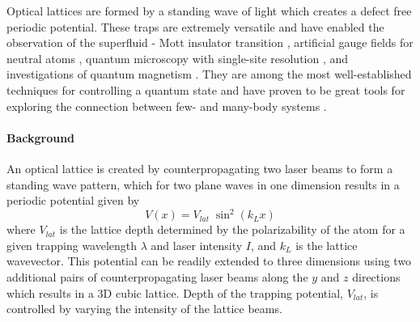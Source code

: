 Optical lattices are formed by a standing wave of light which creates a defect free periodic potential.
These traps are extremely versatile and have enabled the observation of the superfluid - Mott insulator transition \cite{Greiner2002}, artificial gauge fields for neutral atoms \cite{Lin2011}, quantum microscopy with single-site resolution \cite{Bakr2009}, and investigations of quantum magnetism \cite{Hart2015,Greif2015}. 
They are among the most well-established techniques for controlling a quantum state and have proven to be great tools for exploring the connection between few- and many-body systems \cite{Bloch2008}.

\paragraph{Background} \label{sec:latBackground}
An optical lattice is created by counterpropagating two laser beams to form a standing wave pattern, which for two plane waves in one dimension results in a periodic potential given by 
	\begin{equation}
		 V(x) = V_{lat} \; \sin^2(k_L x)
	\end{equation}
where $V_{lat}$ is the lattice depth determined by the polarizability of the atom for a given trapping wavelength $\lambda$ and laser intensity $I$, and $k_L$ is the lattice wavevector.
This potential can be readily extended to three dimensions using two additional pairs of counterpropagating laser beams along the $y$ and $z$ directions which results in a 3D cubic lattice.
Depth of the trapping potential, $V_{lat}$, is controlled by varying the intensity of the lattice beams.

